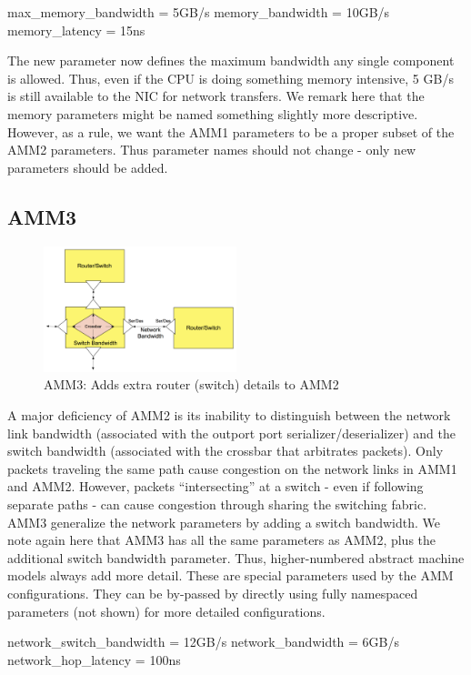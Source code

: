 \begin{ViFile}
max_memory_bandwidth = 5GB/s
memory_bandwidth = 10GB/s
memory_latency = 15ns
\end{ViFile}
The new parameter  now defines the maximum bandwidth any single component is allowed.
Thus, even if the CPU is doing something memory intensive, 5 GB/s is still available to the NIC for network transfers.
We remark here that the memory parameters might be named something slightly more descriptive.
However, as a rule, we want the AMM1 parameters to be a proper subset of the AMM2 parameters.
Thus parameter names should not change - only new parameters should be added.

\subsection{AMM3}
\label{subsec:ammThree}

\begin{figure}
\begin{center}
\includegraphics[width=0.5\textwidth]{figures/amm/amm3_switch.png}
\end{center}
\caption{AMM3: Adds extra router (switch) details to AMM2}
\label{fig:amm3}
\end{figure}

A major deficiency of AMM2 is its inability to distinguish between the network link bandwidth (associated with the outport port serializer/deserializer) and the switch bandwidth (associated with the crossbar that arbitrates packets).  
Only packets traveling the same path cause congestion on the network links in AMM1 and AMM2.
However, packets ``intersecting'' at a switch - even if following separate paths - can cause congestion through sharing the switching fabric.
AMM3 generalize the network parameters by adding a switch bandwidth.
We note again here that AMM3 has all the same parameters as AMM2, plus the additional switch bandwidth parameter.
Thus, higher-numbered abstract machine models always add more detail.
These are special parameters used by the AMM configurations.
They can be by-passed by directly using fully namespaced parameters (not shown) for more detailed configurations.

\begin{ViFile}
network_switch_bandwidth = 12GB/s
network_bandwidth = 6GB/s
network_hop_latency = 100ns
\end{ViFile}

